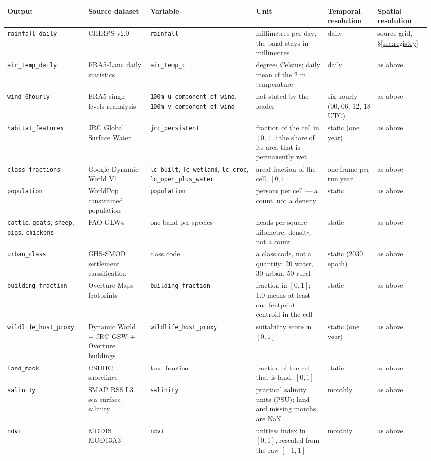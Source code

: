 \documentclass[11pt,a4paper]{article}
\newcommand{\code}[1]{\texttt{#1}}
\begin{document}
\small
\begin{longtable}{@{}p{3.0cm}p{2.4cm}p{2.6cm}p{2.8cm}p{1.9cm}p{1.5cm}@{}}
\toprule
Output & Source dataset & Variable & Unit & Temporal resolution & Spatial
resolution \\
\midrule
\endhead
\code{rainfall\allowbreak\_daily} & CHIRPS v2.0 & \code{rainfall} &
millimetres per day; the band stays in millimetres & daily & source grid,
§\ref{sec:registry} \\
\code{air\allowbreak\_temp\allowbreak\_daily} & ERA5-Land daily statistics &
\code{air\_temp\_c} & degrees Celsius; daily mean of the 2 m temperature &
daily & as above \\
\code{wind\allowbreak\_6hourly} & ERA5 single-levels reanalysis &
\code{100m\_u\allowbreak\_component\allowbreak\_of\allowbreak\_wind},
\code{100m\_v\allowbreak\_component\allowbreak\_of\allowbreak\_wind} & not
stated by the loader & six-hourly (00, 06, 12, 18 UTC) & as above \\
\code{habitat\allowbreak\_features} & JRC Global Surface Water &
\code{jrc\_persistent} & fraction of the cell in $[0,1]$: the share of its
area that is permanently wet & static (one year) & as above \\
\code{class\allowbreak\_fractions} & Google Dynamic World V1 &
\code{lc\_built}, \code{lc\_wetland}, \code{lc\_crop},
\code{lc\_open\allowbreak\_plus\allowbreak\_water} & areal fraction of the
cell, $[0,1]$ & one frame per run year & as above \\
\code{population} & WorldPop constrained population & \code{population} &
persons per cell --- a count, not a density & static & as above \\
\code{cattle}, \code{goats}, \code{sheep}, \code{pigs}, \code{chickens} & FAO
GLW4 & one band per species & heads per square kilometre; density, not a
count & static & as above \\
\code{urban\allowbreak\_class} & GHS-SMOD settlement classification & class
code & a class code, not a quantity: 20 water, 30 urban, 50 rural & static
(2030 epoch) & as above \\
\code{building\allowbreak\_fraction} & Overture Maps footprints &
\code{building\allowbreak\_fraction} & fraction in $[0,1]$; 1.0 means at
least one footprint centroid in the cell & static & as above \\
\code{wildlife\allowbreak\_host\allowbreak\_proxy} & Dynamic World + JRC GSW
+ Overture buildings & \code{wildlife\allowbreak\_host\allowbreak\_proxy} &
suitability score in $[0,1]$ & static (one year) & as above \\
\code{land\allowbreak\_mask} & GSHHG shorelines & land fraction & fraction
of the cell that is land, $[0,1]$ & static & as above \\
\code{salinity} & SMAP RSS L3 sea-surface salinity & \code{salinity} &
practical salinity units (PSU); land and missing months are NaN & monthly &
as above \\
\code{ndvi} & MODIS MOD13A3 & \code{ndvi} & unitless index in $[0,1]$,
rescaled from the raw $[-1,1]$ & monthly & as above \\
\bottomrule
\end{longtable}
\label{tab:units}
\normalsize
\end{document}
